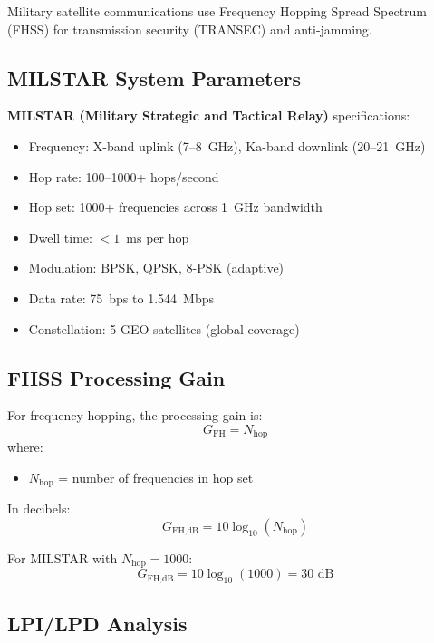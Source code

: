 Military satellite communications use Frequency Hopping Spread Spectrum (FHSS) for transmission security (TRANSEC) and anti-jamming.

\subsection{MILSTAR System Parameters}

\textbf{MILSTAR (Military Strategic and Tactical Relay)} specifications:
\begin{itemize}
\item Frequency: X-band uplink (7--8~GHz), Ka-band downlink (20--21~GHz)
\item Hop rate: 100--1000+ hops/second
\item Hop set: 1000+ frequencies across 1~GHz bandwidth
\item Dwell time: $<1$~ms per hop
\item Modulation: BPSK, QPSK, 8-PSK (adaptive)
\item Data rate: 75~bps to 1.544~Mbps
\item Constellation: 5 GEO satellites (global coverage)
\end{itemize}

\subsection{FHSS Processing Gain}

For frequency hopping, the processing gain is:
\begin{equation}
G_{\text{FH}} = N_{\text{hop}}
\end{equation}
where:
\begin{itemize}
\item $N_{\text{hop}}$ = number of frequencies in hop set
\end{itemize}

In decibels:
\begin{equation}
G_{\text{FH,dB}} = 10 \log_{10}(N_{\text{hop}})
\end{equation}

For MILSTAR with $N_{\text{hop}} = 1000$:
\begin{equation}
G_{\text{FH,dB}} = 10 \log_{10}(1000) = 30 \text{ dB}
\end{equation}

\subsection{LPI/LPD Analysis}


